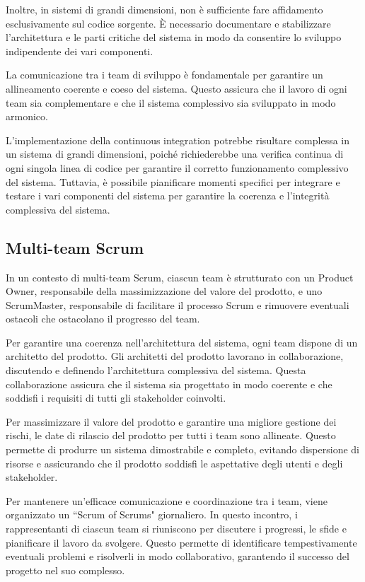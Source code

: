 Inoltre, in sistemi di grandi dimensioni, non è sufficiente fare affidamento
esclusivamente sul codice sorgente. È necessario documentare e stabilizzare
l'architettura e le parti critiche del sistema in modo da consentire lo sviluppo
indipendente dei vari componenti.

La comunicazione tra i team di sviluppo è fondamentale per garantire un allineamento
coerente e coeso del sistema. Questo assicura che il lavoro di ogni team sia complementare
e che il sistema complessivo sia sviluppato in modo armonico.

L'implementazione della continuous integration potrebbe risultare complessa in un sistema
di grandi dimensioni, poiché richiederebbe una verifica continua di ogni singola linea di
codice per garantire il corretto funzionamento complessivo del sistema. Tuttavia, è
possibile pianificare momenti specifici per integrare e testare i vari componenti del
sistema per garantire la coerenza e l'integrità complessiva del sistema.

\subsection{Multi-team Scrum}
In un contesto di multi-team Scrum, ciascun team è strutturato con un
Product Owner, responsabile della massimizzazione del valore del prodotto,
e uno ScrumMaster, responsabile di facilitare il processo
Scrum e rimuovere eventuali ostacoli che ostacolano il progresso del team.

Per garantire una coerenza nell'architettura del sistema, ogni team dispone
di un architetto del prodotto. Gli architetti del prodotto lavorano in collaborazione,
discutendo e definendo l'architettura complessiva del sistema. Questa collaborazione
assicura che il sistema sia progettato
in modo coerente e che soddisfi i requisiti di tutti gli stakeholder coinvolti.

Per massimizzare il valore del prodotto e garantire una migliore gestione dei
rischi, le date di rilascio del prodotto per tutti i team sono allineate.
Questo permette di produrre un sistema dimostrabile e completo, evitando
dispersione di risorse e assicurando che il prodotto soddisfi le aspettative
degli utenti e degli stakeholder.

Per mantenere un'efficace comunicazione e coordinazione tra i team, viene
organizzato un ``Scrum of Scrums" giornaliero. In questo incontro, i
rappresentanti di ciascun team si riuniscono per discutere i progressi,
le sfide e pianificare il lavoro da svolgere. Questo permette di identificare
tempestivamente eventuali problemi e risolverli in
modo collaborativo, garantendo il successo del progetto nel suo complesso.